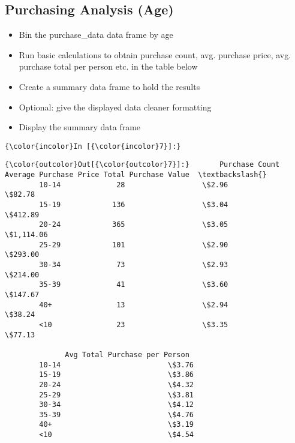 \documentclass[11pt]{article}
\begin{document}
    \hypertarget{purchasing-analysis-age}{%
\subsection{Purchasing Analysis (Age)}\label{purchasing-analysis-age}}

    \begin{itemize}
\item
  Bin the purchase\_data data frame by age
\item
  Run basic calculations to obtain purchase count, avg. purchase price,
  avg. purchase total per person etc. in the table below
\item
  Create a summary data frame to hold the results
\item
  Optional: give the displayed data cleaner formatting
\item
  Display the summary data frame
\end{itemize}

    \begin{Verbatim}[commandchars=\\\{\}]
{\color{incolor}In [{\color{incolor}7}]:} 
\end{Verbatim}


\begin{Verbatim}[commandchars=\\\{\}]
{\color{outcolor}Out[{\color{outcolor}7}]:}       Purchase Count Average Purchase Price Total Purchase Value  \textbackslash{}
        10-14             28                  \$2.96               \$82.78   
        15-19            136                  \$3.04              \$412.89   
        20-24            365                  \$3.05            \$1,114.06   
        25-29            101                  \$2.90              \$293.00   
        30-34             73                  \$2.93              \$214.00   
        35-39             41                  \$3.60              \$147.67   
        40+               13                  \$2.94               \$38.24   
        <10               23                  \$3.35               \$77.13   
        
              Avg Total Purchase per Person  
        10-14                         \$3.76  
        15-19                         \$3.86  
        20-24                         \$4.32  
        25-29                         \$3.81  
        30-34                         \$4.12  
        35-39                         \$4.76  
        40+                           \$3.19  
        <10                           \$4.54  
\end{Verbatim}
            
\end{document}
